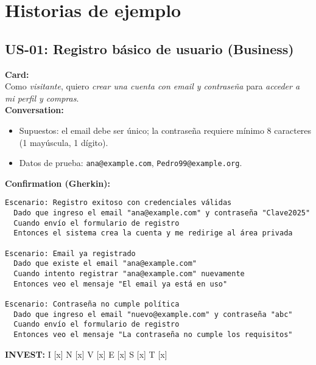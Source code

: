 \documentclass[11pt]{article}
\begin{document}
\section*{Historias de ejemplo}

\subsection*{US-01: Registro básico de usuario (Business)}
\begin{tcolorbox}
\textbf{Card:}\\
Como \emph{visitante}, quiero \emph{crear una cuenta con email y contraseña} para \emph{acceder a mi perfil y compras}.\\[3pt]
\textbf{Conversation:}
\begin{itemize}[leftmargin=1.2em]
  \item Supuestos: el email debe ser único; la contraseña requiere mínimo 8 caracteres (1 mayúscula, 1 dígito).
  \item Datos de prueba: \texttt{ana@example.com}, \texttt{Pedro99@example.org}.
\end{itemize}
\textbf{Confirmation (Gherkin):}
\begin{verbatim}
Escenario: Registro exitoso con credenciales válidas
  Dado que ingreso el email "ana@example.com" y contraseña "Clave2025"
  Cuando envío el formulario de registro
  Entonces el sistema crea la cuenta y me redirige al área privada

Escenario: Email ya registrado
  Dado que existe el email "ana@example.com"
  Cuando intento registrar "ana@example.com" nuevamente
  Entonces veo el mensaje "El email ya está en uso"

Escenario: Contraseña no cumple política
  Dado que ingreso el email "nuevo@example.com" y contraseña "abc"
  Cuando envío el formulario de registro
  Entonces veo el mensaje "La contraseña no cumple los requisitos"
\end{verbatim}
\textbf{INVEST:} I [x] N [x] V [x] E [x] S [x] T [x]
\end{tcolorbox}

\end{document}
